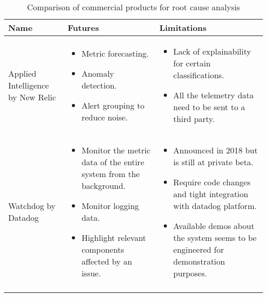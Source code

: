 \begin{longtable}{| p{40mm} | p{55mm} | p{55mm} |}
\hline
  \textbf{Name} &
  \textbf{Futures} &
  \textbf{Limitations} \\ \hline
  Applied Intelligence by New Relic &
  \vspace{-8mm}
  \begin{itemize}[leftmargin=*,noitemsep,nolistsep] 
    \item Metric forecasting.
    \item Anomaly detection.
    \item Alert grouping to reduce noise.
  \vspace{-7mm}
  \end{itemize} &
  \vspace{-8mm}
  \begin{itemize}[leftmargin=*,noitemsep,nolistsep] 
    \item Lack of explainability for certain classifications.
    \item All the telemetry data need to be sent to a third party.
  \vspace{-7mm}
  \end{itemize} \\ \hline
  Watchdog by Datadog &
  \vspace{-8mm}
  \begin{itemize}[leftmargin=*,noitemsep,nolistsep] 
    \item Monitor the metric data of the entire system from the background.
    \item Monitor logging data.
    \item Highlight relevant components affected by an issue.
  \vspace{-7mm}
  \end{itemize} &
  \vspace{-8mm}
  \begin{itemize}[leftmargin=*,noitemsep,nolistsep] 
    \item Announced in 2018 but is still at private beta.
    \item Require code changes and tight integration with datadog platform.
    \item Available demos about the system seems to be engineered for demonstration purposes.
  \vspace{-7mm}
  \end{itemize} \\ \hline
  \caption{Comparison of commercial products for root cause analysis}
\end{longtable}